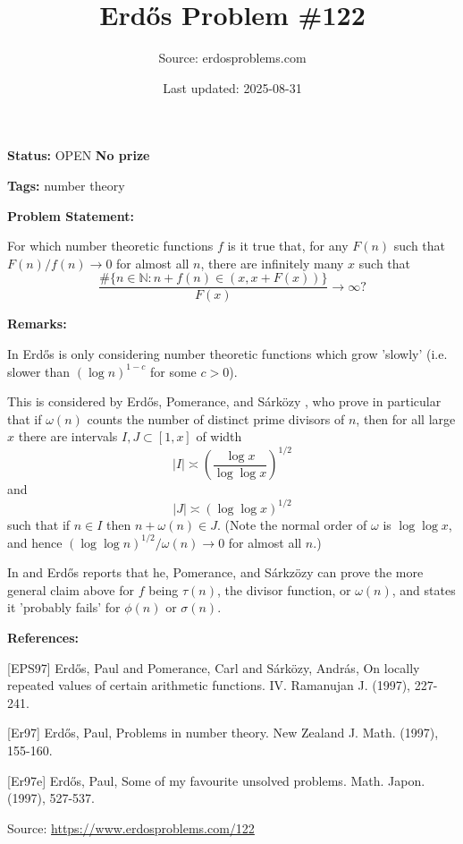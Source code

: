\documentclass{article}
\title{Erd\H{o}s Problem \#122}
\date{Last updated: 2025-08-31}
\author{Source: erdosproblems.com}
\begin{document}
\maketitle

\noindent\textbf{Status:} OPEN \quad \textbf{No prize}

\noindent\textbf{Tags:} number theory

\medskip
\noindent\textbf{Problem Statement:}

For which number theoretic functions $f$ is it true that, for any $F(n)$ such that $F(n)/f(n)\to 0$ for almost all $n$, there are infinitely many $x$ such that\[\frac{\#\{ n\in \mathbb{N} : n+f(n)\in (x,x+F(x))\}}{F(x)}\to \infty?\]

\bigskip
\noindent\textbf{Remarks:}

In \cite{Er97} Erd\H{o}s is only considering number theoretic functions which grow 'slowly' (i.e. slower than $(\log n)^{1-c}$ for some $c>0$). 

This is considered by Erd\H{o}s, Pomerance, and S\'{a}rk\"{o}zy \cite{EPS97}, who prove in particular that if $\omega(n)$ counts the number of distinct prime divisors of $n$, then for all large $x$ there are intervals $I,J\subset [1,x]$ of width\[\lvert I\rvert\asymp \left(\frac{\log x}{\log\log x}\right)^{1/2}\]and\[\lvert J\rvert \asymp (\log\log x)^{1/2}\]such that if $n\in I$ then $n+\omega(n)\in J$. (Note the normal order of $\omega$ is $\log\log x$, and hence $(\log\log n)^{1/2}/\omega(n)\to 0$ for almost all $n$.) 

In \cite{Er97} and \cite{Er97e} Erd\H{o}s reports that he, Pomerance, and S\'{a}rkz\"{o}zy can prove the more general claim above for $f$ being $\tau(n)$, the divisor function, or $\omega(n)$, and states it 'probably fails' for $\phi(n)$ or $\sigma(n)$.

\bigskip
\noindent\textbf{References:}

[EPS97] Erd\H{o}s, Paul and Pomerance, Carl and S\'{a}rk\"{o}zy, Andr\'{a}s, On locally repeated values of certain arithmetic functions. IV. Ramanujan J. (1997), 227-241.
 
 [Er97] Erd\H{o}s, Paul, Problems in number theory. New Zealand J. Math. (1997), 155-160.
 
 [Er97e] Erd\H{o}s, Paul, Some of my favourite unsolved problems. Math. Japon. (1997), 527-537.

\bigskip
\noindent\small{Source: \url{https://www.erdosproblems.com/122}}
\end{document}

